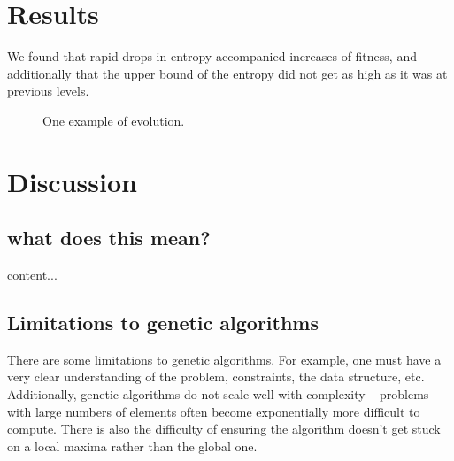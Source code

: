 \documentclass[11pt]{article}
\begin{document}
\section{Results}
\label{sec:orged0917a}
We found that rapid drops in entropy accompanied increases of fitness, and
additionally that the upper bound of the entropy did not get as high
as it was at previous levels.


\begin{figure}
  \label{fig:gen-info_pid3095791}
  \centering
  \caption{One example of evolution.}
  \label{fig:multi-step}
\end{figure}

\begin{figure}
\end{figure}

\section{Discussion}
\label{sec:org7999995}
\subsection{what does this mean?}
\label{sec:orgf7b36ed}
content...

\subsection{Limitations to genetic algorithms}
\label{sec:org148bf83}
There are some limitations to genetic algorithms. For example, one must
have a very clear understanding of the problem, constraints, the data
structure, etc. Additionally, genetic algorithms do not scale well with
complexity -- problems with large numbers of elements often become exponentially
more difficult to compute. There is also the difficulty of ensuring the
algorithm doesn't get stuck on a local maxima rather than the global one.
\end{document}
